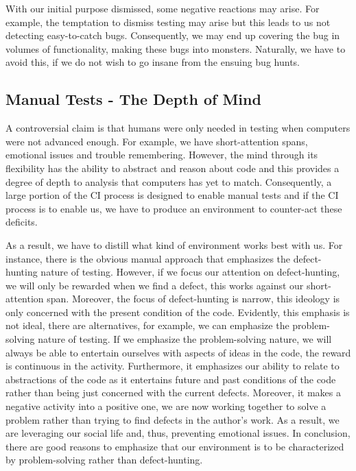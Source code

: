 \documentclass{article}
\begin{document}
With our initial purpose dismissed, some negative reactions may arise.
For example, the temptation to dismiss testing may arise but this leads to us not detecting easy-to-catch bugs. 
Consequently, we may end up covering the bug in volumes of functionality, making these bugs into monsters.
Naturally, we have to avoid this, if we do not wish to go insane from the ensuing bug hunts.

\subsection{Manual Tests - The Depth of Mind}

A controversial claim is that humans were only needed in testing when computers were not advanced enough.
For example, we have short-attention spans, emotional issues and trouble remembering.
However, the mind through its flexibility has the ability to abstract and reason about code and this provides a degree of depth to analysis that computers has yet to match.
Consequently, a large portion of the CI process is designed to enable manual tests and if the CI process is to enable us, we have to produce an environment to counter-act these deficits. 

As a result, we have to distill what kind of environment works best with us.
For instance, there is the obvious manual approach that emphasizes the defect-hunting nature of testing.
However, if we focus our attention on defect-hunting, we will only be rewarded when we find a defect, this works against our short-attention span.
Moreover, the focus of defect-hunting is narrow, this ideology is only concerned with the present condition of the code. 
Evidently, this emphasis is not ideal, there are alternatives, for example, we can emphasize the problem-solving nature of testing.
If we emphasize the problem-solving nature, we will always be able to entertain ourselves with aspects of ideas in the code, the reward is continuous in the activity.
Furthermore, it emphasizes our ability to relate to abstractions of the code as it entertains future and past conditions of the code rather than being just concerned with the current defects.
Moreover, it makes a negative activity into a positive one, we are now working together to solve a problem rather than trying to find defects in the author's work.
As a result, we are leveraging our social life and, thus, preventing emotional issues.
In conclusion, there are good reasons to emphasize that our environment is to be characterized by problem-solving rather than defect-hunting.
\end{document}
